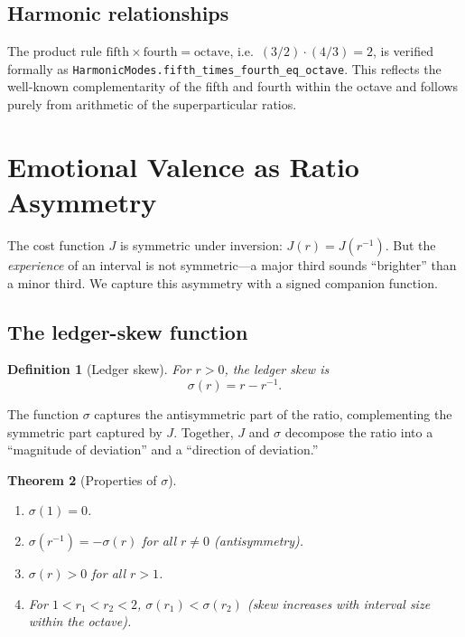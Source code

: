 \documentclass[11pt,a4paper]{article}
\newtheorem{theorem}{Theorem}
\newtheorem{definition}[theorem]{Definition}
\begin{document}
\subsection{Harmonic relationships}

The product rule $\text{fifth}\times\text{fourth}=\text{octave}$, i.e.\
$(3/2)\cdot(4/3)=2$, is verified formally as
\texttt{HarmonicModes.fifth\_times\_fourth\_eq\_octave}.  This reflects
the well-known complementarity of the fifth and fourth within the
octave and follows purely from arithmetic of the superparticular
ratios.

\section{Emotional Valence as Ratio Asymmetry}
\label{sec:valence}

The cost function $J$ is symmetric under inversion: $J(r)=J(r^{-1})$.
But the \emph{experience} of an interval is not symmetric---a major
third sounds ``brighter'' than a minor third.  We capture this
asymmetry with a signed companion function.

\subsection{The ledger-skew function}

\begin{definition}[Ledger skew]
\label{def:skew}
For $r>0$, the \emph{ledger skew} is
\begin{equation}
  \label{eq:skew}
  \sigma(r) = r - r^{-1}.
\end{equation}
\end{definition}

\noindent The function $\sigma$ captures the antisymmetric part of the
ratio, complementing the symmetric part captured by $J$.  Together,
$J$ and $\sigma$ decompose the ratio into a ``magnitude of deviation''
and a ``direction of deviation.''

\begin{theorem}[Properties of $\sigma$]
\label{thm:skew-props}
\leavevmode
\begin{enumerate}[label=(\roman*)]
  \item $\sigma(1)=0$.
  \item $\sigma(r^{-1})=-\sigma(r)$ for all $r\neq 0$
    \textup{(}antisymmetry\textup{)}.
  \item $\sigma(r)>0$ for all $r>1$.
  \item For $1<r_1<r_2<2$, $\sigma(r_1)<\sigma(r_2)$
    \textup{(}skew increases with interval size within the
    octave\textup{)}.
\end{enumerate}
\end{theorem}
\end{document}
